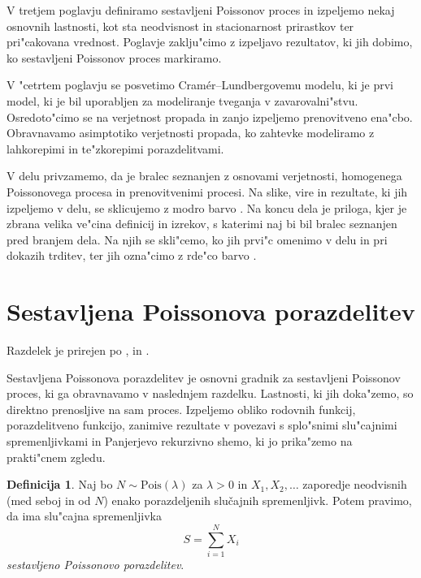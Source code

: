 \documentclass[12pt, a4paper, reqno]{amsart}
\theoremstyle{definition}
\newtheorem{definicija}{Definicija}[section]
\theoremstyle{plain}
\newcommand{\1}{\mathds{1}}
\newcommand{\Pois}[1]{\text{Pois}(#1)}
\begin{document}
    V tretjem poglavju definiramo sestavljeni Poissonov proces in izpeljemo nekaj osnovnih lastnosti, kot sta 
    neodvisnost in stacionarnost prirastkov ter pri"cakovana vrednost. Poglavje zaklju"cimo z izpeljavo rezultatov,
    ki jih dobimo, ko sestavljeni Poissonov proces markiramo.

    V "cetrtem poglavju se posvetimo Cramér--Lundbergovemu modelu, ki je prvi model, ki je bil uporabljen za
    modeliranje tveganja v zavarovalni"stvu. Osredoto"cimo se na verjetnost propada in zanjo izpeljemo prenovitveno
    ena"cbo. Obravnavamo asimptotiko verjetnosti propada, ko zahtevke modeliramo z lahkorepimi in te"zkorepimi
    porazdelitvami.

    V delu privzamemo, da je bralec seznanjen z osnovami verjetnosti, homogenega Poissonovega procesa in prenovitvenimi procesi.
    Na slike, vire in rezultate, ki jih izpeljemo v delu, se sklicujemo z modro barvo .
    Na koncu dela je priloga, kjer je zbrana velika ve"cina definicij in izrekov, s katerimi naj bi bil bralec seznanjen pred branjem dela. Na njih 
    se skli"cemo, ko jih prvi"c omenimo v delu in pri dokazih trditev, ter jih ozna"cimo z rde"co barvo .

    \newpage
\section{Sestavljena Poissonova porazdelitev}

    \noindent
    Razdelek je prirejen po \cite{1}, \cite{2} in  \cite{4}.

    Sestavljena Poissonova porazdelitev je osnovni gradnik za sestavljeni Poissonov proces, ki ga obravnavamo 
    v naslednjem razdelku. Lastnosti, ki jih doka"zemo, so direktno prenosljive na sam proces. Izpeljemo 
    obliko rodovnih funkcij, porazdelitveno funkcijo, zanimive rezultate v povezavi s 
    splo"snimi slu"cajnimi spremenljivkami in Panjerjevo rekurzivno shemo, ki jo prika"zemo na 
    prakti"cnem zgledu.

    \begin{definicija}
        Naj bo $N\sim \Pois{\lambda}$  za $\lambda >0$ in $X_1, X_2, \dots$ zaporedje neodvisnih (med seboj in od $N$)
        enako porazdeljenih slučajnih spremenljivk. Potem pravimo, da ima slu"cajna spremenljivka
        \begin{equation*}
            S = \sum_{i=1}^NX_i
        \end{equation*}
        \textit{sestavljeno Poissonovo porazdelitev}. 
        \label{def:sestavljenaPoissonovaPorazdelitev}
    \end{definicija}
\end{document}
